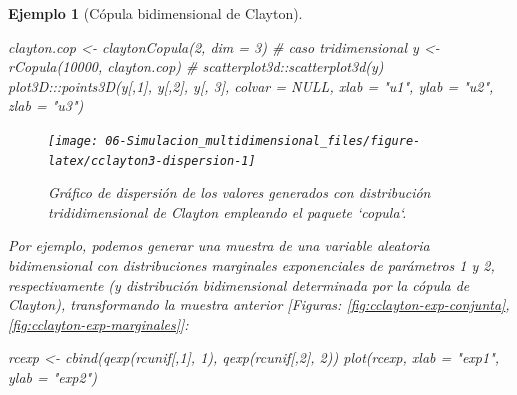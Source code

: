\documentclass[
]{book}
\newenvironment{Shaded}{\begin{snugshade}}{\end{snugshade}}
\newcommand{\AttributeTok}[1]{\textcolor[rgb]{0.77,0.63,0.00}{#1}}
\newcommand{\CommentTok}[1]{\textcolor[rgb]{0.56,0.35,0.01}{\textit{#1}}}
\newcommand{\ConstantTok}[1]{\textcolor[rgb]{0.00,0.00,0.00}{#1}}
\newcommand{\DecValTok}[1]{\textcolor[rgb]{0.00,0.00,0.81}{#1}}
\newcommand{\FunctionTok}[1]{\textcolor[rgb]{0.00,0.00,0.00}{#1}}
\newcommand{\NormalTok}[1]{#1}
\newcommand{\OtherTok}[1]{\textcolor[rgb]{0.56,0.35,0.01}{#1}}
\newcommand{\SpecialCharTok}[1]{\textcolor[rgb]{0.00,0.00,0.00}{#1}}
\newcommand{\StringTok}[1]{\textcolor[rgb]{0.31,0.60,0.02}{#1}}
\theoremstyle{break}
\newtheorem{example}{Ejemplo}[chapter]
\theoremstyle{nonumberplain}
\begin{document}
\begin{example}[Cópula bidimensional de Clayton]
\begin{Shaded}
\begin{Highlighting}[]
\NormalTok{clayton.cop }\OtherTok{\textless{}{-}} \FunctionTok{claytonCopula}\NormalTok{(}\DecValTok{2}\NormalTok{, }\AttributeTok{dim =} \DecValTok{3}\NormalTok{) }\CommentTok{\# caso tridimensional}
\NormalTok{y }\OtherTok{\textless{}{-}} \FunctionTok{rCopula}\NormalTok{(}\DecValTok{10000}\NormalTok{, clayton.cop)}
\CommentTok{\# scatterplot3d::scatterplot3d(y)}
\NormalTok{plot3D}\SpecialCharTok{:::}\FunctionTok{points3D}\NormalTok{(y[,}\DecValTok{1}\NormalTok{], y[,}\DecValTok{2}\NormalTok{], y[, }\DecValTok{3}\NormalTok{], }\AttributeTok{colvar =} \ConstantTok{NULL}\NormalTok{, }
                  \AttributeTok{xlab =} \StringTok{"u1"}\NormalTok{, }\AttributeTok{ylab =} \StringTok{"u2"}\NormalTok{, }\AttributeTok{zlab =} \StringTok{"u3"}\NormalTok{) }
\end{Highlighting}
\end{Shaded}

\begin{figure}[!htb]

{\centering \texttt{[image: 06-Simulacion\_multidimensional\_files/figure-latex/cclayton3-dispersion-1]} 

}

\caption{Gráfico de dispersión de los valores generados con distribución trididimensional de Clayton empleando el paquete `copula`.}\label{fig:cclayton3-dispersion}
\end{figure}

Por ejemplo, podemos generar una muestra de una variable aleatoria bidimensional con distribuciones marginales exponenciales de parámetros 1 y 2, respectivamente (y distribución bidimensional determinada por la cópula de Clayton), transformando la muestra anterior {[}Figuras: \ref{fig:cclayton-exp-conjunta}, \ref{fig:cclayton-exp-marginales}{]}:

\begin{Shaded}
\begin{Highlighting}[]
\NormalTok{rcexp }\OtherTok{\textless{}{-}} \FunctionTok{cbind}\NormalTok{(}\FunctionTok{qexp}\NormalTok{(rcunif[,}\DecValTok{1}\NormalTok{], }\DecValTok{1}\NormalTok{), }\FunctionTok{qexp}\NormalTok{(rcunif[,}\DecValTok{2}\NormalTok{], }\DecValTok{2}\NormalTok{))}
\FunctionTok{plot}\NormalTok{(rcexp, }\AttributeTok{xlab =} \StringTok{"exp1"}\NormalTok{, }\AttributeTok{ylab =} \StringTok{"exp2"}\NormalTok{)  }
\end{Highlighting}
\end{Shaded}


\end{example}
\end{document}
